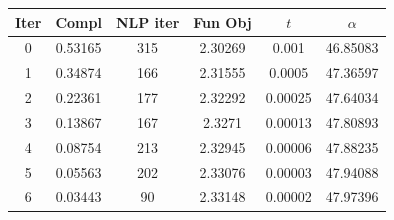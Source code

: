 \begin{tabular}{c c c c c c}
\toprule
Iter & Compl & NLP iter & Fun Obj & $t$ & $\alpha$ \\
\midrule
0 & 0.53165 & 315 & 2.30269 & 0.001 & 46.85083 \\
1 & 0.34874 & 166 & 2.31555 & 0.0005 & 47.36597 \\
2 & 0.22361 & 177 & 2.32292 & 0.00025 & 47.64034 \\
3 & 0.13867 & 167 & 2.3271 & 0.00013 & 47.80893 \\
4 & 0.08754 & 213 & 2.32945 & 0.00006 & 47.88235 \\
5 & 0.05563 & 202 & 2.33076 & 0.00003 & 47.94088 \\
6 & 0.03443 & 90 & 2.33148 & 0.00002 & 47.97396 \\
\bottomrule
\end{tabular}